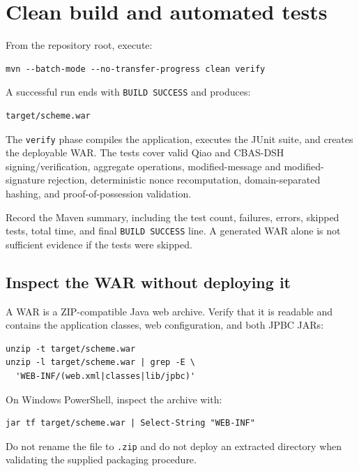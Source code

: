 \documentclass[11pt,a4paper]{article}
\begin{document}
\section{Clean build and automated tests}

From the repository root, execute:

\begin{lstlisting}[style=terminal]
mvn --batch-mode --no-transfer-progress clean verify
\end{lstlisting}

A successful run ends with \texttt{BUILD SUCCESS} and produces:

\begin{lstlisting}[style=terminal]
target/scheme.war
\end{lstlisting}

The \texttt{verify} phase compiles the application, executes the JUnit suite, and creates the deployable WAR. The tests cover valid Qiao and CBAS-DSH signing/verification, aggregate operations, modified-message and modified-signature rejection, deterministic nonce recomputation, domain-separated hashing, and proof-of-possession validation.

Record the Maven summary, including the test count, failures, errors, skipped tests, total time, and final \texttt{BUILD SUCCESS} line. A generated WAR alone is not sufficient evidence if the tests were skipped.

\subsection{Inspect the WAR without deploying it}

A WAR is a ZIP-compatible Java web archive. Verify that it is readable and contains the application classes, web configuration, and both JPBC JARs:

\begin{lstlisting}[style=terminal]
unzip -t target/scheme.war
unzip -l target/scheme.war | grep -E \
  'WEB-INF/(web.xml|classes|lib/jpbc)'
\end{lstlisting}

On Windows PowerShell, inspect the archive with:

\begin{lstlisting}[style=terminal]
jar tf target/scheme.war | Select-String "WEB-INF"
\end{lstlisting}

Do not rename the file to \texttt{.zip} and do not deploy an extracted directory when validating the supplied packaging procedure.
\end{document}
